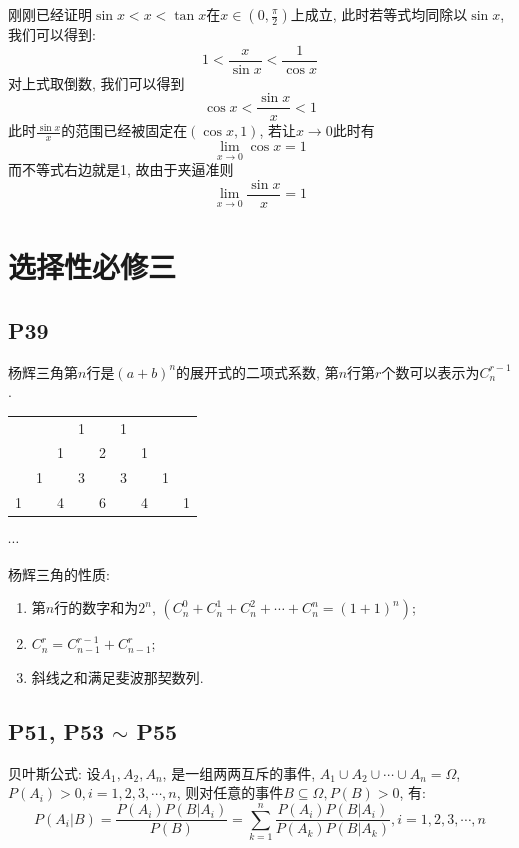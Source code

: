 \documentclass{book}
\begin{document}
    刚刚已经证明$\sin x<x<\tan x$在$\displaystyle x\in\left( 0,\frac{\pi}{2} \right)$上成立, 此时若等式均同除以$\sin x$, 我们可以得到:$$1<\frac{x}{\sin x}<\frac{1}{\cos x}$$对上式取倒数, 我们可以得到$$\cos x<\frac{\sin x}{x}<1$$此时$\displaystyle \frac{\sin x}{x}$的范围已经被固定在$\left( \cos x,1 \right)$, 若让$x\rightarrow 0$此时有$$\lim_{x \to 0} \cos x=1$$而不等式右边就是1, 故由于\textcolor[rgb]{0.75,0.17,0.22}{夹逼准则}$$\lim_{x \to 0} \frac{\sin x}{x}=1 $$

    \chapter{选择性必修三}

    \section{\textcolor[rgb]{0.11,0.65,0.52}{P39}}
    \textcolor[rgb]{0.38,0.11,0.2}{杨辉三角}第$n$行是$(a+b)^n$的展开式的二项式系数, 第$n$行第$r$个数可以表示为$C_n^{r-1}$.

    \begin{table}[htbp]
        \centering
        \begin{tabular}{lllllllll}
              &   &   & 1 &   & 1 &   &   &   \\
              &   & 1 &   & 2 &   & 1 &   &   \\
              & 1 &   & 3 &   & 3 &   & 1 &   \\
            1 &   & 4 &   & 6 &   & 4 &   & 1 \\
        \end{tabular}
    \end{table}
    \begin{center}
        $\cdots$
    \end{center}

    杨辉三角的性质:

    \begin{enumerate}
        \item 第$n$行的数字和为$2^n$, $\left( C_n^0+C_n^1+C_n^2+\cdots+C_n^n=(1+1)^n \right)$;
        \item $C_n^r=C_{n-1}^{r-1}+C_{n-1}^r$;
        \item 斜线之和满足斐波那契数列.
    \end{enumerate}

    \section{\textcolor[rgb]{0.11,0.65,0.52}{P51, P53 $\sim$ P55}}
    贝叶斯公式: 设$A_1,A_2,A_n$, 是一组两两互斥的事件, $A_1\cup A_2\cup \cdots \cup A_n=\Omega$, $P(A_i)>0,i=1,2,3,\cdots,n$, 则对任意的事件$B\subseteq \Omega,P(B)>0$, 有:$$P\left( A_i\Big|B \right)=\frac{P\left( A_i \right)P\left( B\Big|A_i \right)}{P(B)}=\sum_{k=1}^{n} \frac{P(A_i)P(B|A_i)}{P(A_k)P(B \Big |A_k)},i=1,2,3,\cdots,n$$
\end{document}
